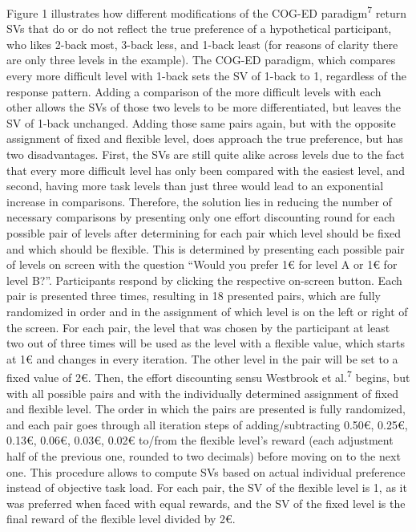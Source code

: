 \documentclass[
  man,floatsintext]{apa6}
\begin{document}
Figure 1 illustrates how different modifications of the COG-ED paradigm\textsuperscript{7} return SVs that do or do not reflect the true preference of a hypothetical participant, who likes 2-back most, 3-back less, and 1-back least (for reasons of clarity there are only three levels in the example).
The COG-ED paradigm, which compares every more difficult level with 1-back sets the SV of 1-back to 1, regardless of the response pattern.
Adding a comparison of the more difficult levels with each other allows the SVs of those two levels to be more differentiated, but leaves the SV of 1-back unchanged.
Adding those same pairs again, but with the opposite assignment of fixed and flexible level, does approach the true preference, but has two disadvantages.
First, the SVs are still quite alike across levels due to the fact that every more difficult level has only been compared with the easiest level, and second, having more task levels than just three would lead to an exponential increase in comparisons.
Therefore, the solution lies in reducing the number of necessary comparisons by presenting only one effort discounting round for each possible pair of levels after determining for each pair which level should be fixed and which should be flexible.
This is determined by presenting each possible pair of levels on screen with the question ``Would you prefer 1€ for level A or 1€ for level B?''.
Participants respond by clicking the respective on-screen button.
Each pair is presented three times, resulting in 18 presented pairs, which are fully randomized in order and in the assignment of which level is on the left or right of the screen.
For each pair, the level that was chosen by the participant at least two out of three times will be used as the level with a flexible value, which starts at 1€ and changes in every iteration.
The other level in the pair will be set to a fixed value of 2€.
Then, the effort discounting sensu Westbrook et al.\textsuperscript{7} begins, but with all possible pairs and with the individually determined assignment of fixed and flexible level.
The order in which the pairs are presented is fully randomized, and each pair goes through all iteration steps of adding/subtracting 0.50€, 0.25€, 0.13€, 0.06€, 0.03€, 0.02€ to/from the flexible level's reward (each adjustment half of the previous one, rounded to two decimals) before moving on to the next one.
This procedure allows to compute SVs based on actual individual preference instead of objective task load.
For each pair, the SV of the flexible level is 1, as it was preferred when faced with equal rewards, and the SV of the fixed level is the final reward of the flexible level divided by 2€.
\end{document}
